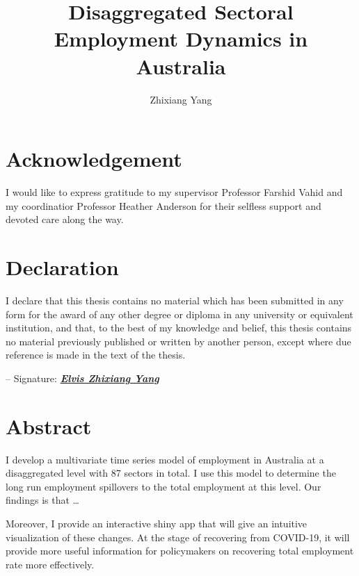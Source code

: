 \documentclass{monashthesis}
\author{Zhixiang Yang}
\title{Disaggregated Sectoral Employment Dynamics in Australia}
\begin{document}

\titlepage

{\sf\tighttoc\doublespacing}

\clearpage{}\setcounter{page}{0}

\hypertarget{acknowledgement}{%
\chapter*{Acknowledgement}\label{acknowledgement}}

I would like to express gratitude to my supervisor Professor Farshid Vahid and my coordinatior Professor Heather Anderson for their selfless support and devoted care along the way.

\hypertarget{declaration}{%
\chapter*{Declaration}\label{declaration}}

I declare that this thesis contains no material which has been submitted in any form for the award of any other degree or diploma in any university or equivalent institution, and that, to the best of my knowledge and belief, this thesis contains no material previously published or written by another person, except where due reference is made in the text of the thesis.

\vspace{12pt}

-- Signature: \underline{\emph{\textbf{Elvis Zhixiang Yang}}}

\hypertarget{abstract}{%
\chapter*{Abstract}\label{abstract}}

I develop a multivariate time series model of employment in Australia at a disaggregated level with 87 sectors in total. I use this model to determine the long run employment spillovers to the total employment at this level. Our findings is that \ldots{}

Moreover, I provide an interactive shiny app that will give an intuitive visualization of these changes. At the stage of recovering from COVID-19, it will provide more useful information for policymakers on recovering total employment rate more effectively.
\end{document}
